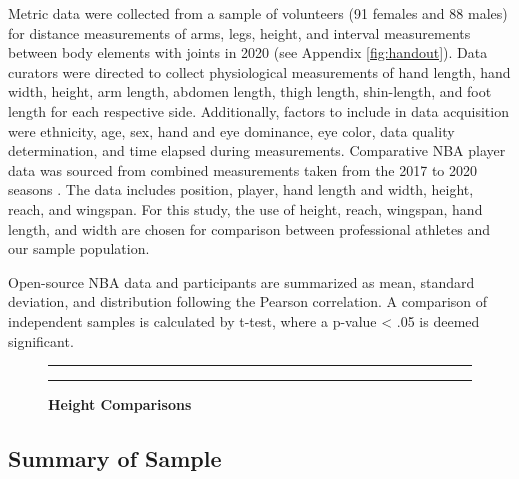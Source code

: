 \documentclass[]{article}
\begin{document}
Metric data were collected from a sample of volunteers (91 females and
88 males) for distance measurements of arms, legs, height, and interval
measurements between body elements with joints in 2020 (see Appendix
\ref{fig:handout}). Data curators were directed to collect physiological
measurements of hand length, hand width, height, arm length, abdomen
length, thigh length, shin-length, and foot length for each respective
side. Additionally, factors to include in data acquisition were
ethnicity, age, sex, hand and eye dominance, eye color, data quality
determination, and time elapsed during measurements. Comparative NBA
player data was sourced from combined measurements taken from the 2017
to 2020 seasons \citep{NBA:Stats}. The data includes position, player,
hand length and width, height, reach, and wingspan. For this study, the
use of height, reach, wingspan, hand length, and width are chosen for
comparison between professional athletes and our sample population.

Open-source NBA data and participants are summarized as mean, standard
deviation, and distribution following the Pearson correlation. A
comparison of independent samples is calculated by t-test, where a
p-value \textless{} .05 is deemed significant.

\begin{figure}[!ht]
    \hrule
    \caption{ \textbf{Height Comparisons} }
    \begin{center}
    \end{center}
    \label{fig:comparison}
    \hrule
\end{figure}

\subsection{Summary of Sample}
\label{sec:data-sample}
\end{document}
